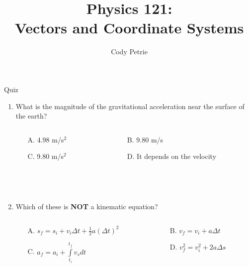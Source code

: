 \documentclass{beamer}
\title[{\color{white}{Chapters 3}}]{Physics 121: \\ Vectors and Coordinate Systems}
\author{Cody Petrie}
\institute{Mesa Community College}
\date{}
\begin{document}
\begin{frame}
\titlepage
\end{frame}



\begin{frame}{Quiz}
\begin{enumerate}
   \item What is the magnitude of the gravitational acceleration near the surface of the earth?
   \begin{columns}
      \begin{column}{0.5\textwidth}
      \begin{enumerate}
         \item[A.] 4.98 m/s$^2$
         \item[C.] 9.80 m/s$^2$
      \end{enumerate}
      \end{column}
      \begin{column}{0.5\textwidth}
      \begin{enumerate}
         \item[B.] 9.80 m/s
         \item[D.] It depends on the velocity
      \end{enumerate}
      \end{column}
   \end{columns}
~\\~\\
   \item Which of these is {\bf NOT} a kinematic equation?
   \begin{columns}
      \begin{column}{0.5\textwidth}
      \begin{enumerate}
         \item[A.] $s_f = s_i + v_i\Delta t + \frac{1}{2}a(\Delta t)^2$
         \item[C.] $a_f = a_i + \int\limits_{t_i}^{t_f} v_sdt$
      \end{enumerate}
      \end{column}
      \begin{column}{0.5\textwidth}
      \begin{enumerate}
         \item[B.] $v_f = v_i + a\Delta t$
         \item[D.] $v_f^2 = v_i^2 + 2a\Delta s$
      \end{enumerate}
      \end{column}
   \end{columns}
\end{enumerate}
\end{frame}
\end{document}
